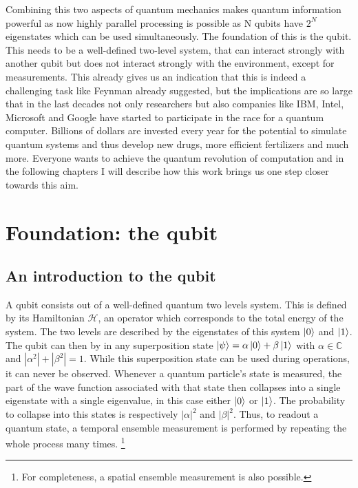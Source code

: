 Combining this two aspects of quantum mechanics makes quantum information powerful as now highly parallel processing is possible as N qubits have $2^N$ eigenstates which can be used simultaneously.   
The foundation of this is the qubit. This needs to be a well-defined two-level system, that can interact strongly with another qubit but does not interact strongly with the environment, except for measurements. This already gives us an indication that this is indeed a challenging task like Feynman already suggested, but the implications are so large that in the last decades not only researchers but also companies like IBM, Intel, Microsoft and Google have started to participate in the race for a quantum computer. Billions of dollars are invested every year for the potential to simulate quantum systems and thus develop new drugs, more efficient fertilizers and much more. Everyone wants to achieve the quantum revolution of computation and in the following chapters I will describe how this work brings us one step closer towards this aim. 



\section{Foundation: the qubit}
 

\subsection{An introduction to the qubit}

\cite{Smith2017}
A qubit consists out of a well-defined quantum two levels system. This is defined by its Hamiltonian $\mathcal{H}$, an operator which corresponds to the total energy of the system. The two levels are described by the eigenstates of this system $\ket{0}$ and $\ket{1}$. The qubit can then by in any superposition state $\ket{\psi}=\alpha\ket{0}+\beta\ket{1}$ with $\alpha\in\mathds{C}$ and $|\alpha^2|+|\beta^2|=1$. While this superposition state can be used during operations, it can never be observed. Whenever a quantum particle's state is measured, the part of the wave function associated with that state then collapses into a single eigenstate with a single eigenvalue, in this case either $\ket{0}$ or $\ket{1}$. The probability to collapse into this states is respectively $|\alpha|^2$ and $|\beta|^2$. Thus, to readout a quantum state, a temporal ensemble measurement is performed by repeating the whole process many times. \footnote{For completeness, a spatial ensemble measurement is also possible.} 

